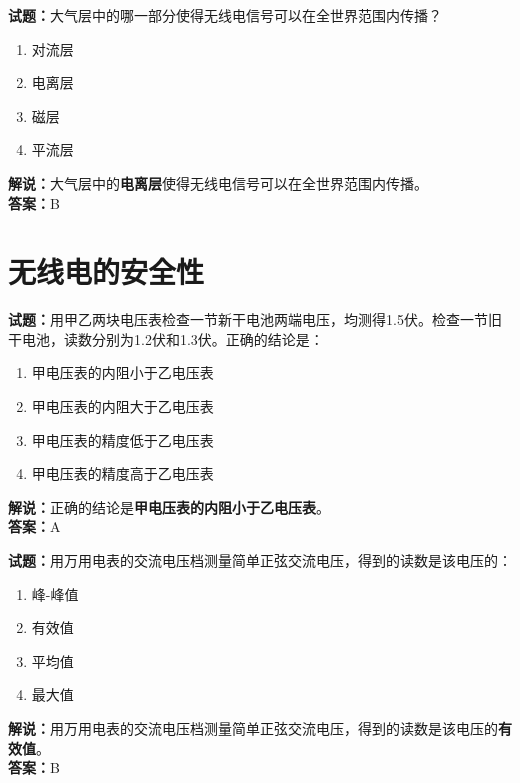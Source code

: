 \documentclass{ctexbook}
\begin{document}
\bigskip


\noindent\textbf{试题：}大气层中的哪一部分使得无线电信号可以在全世界范围内传播？
\begin{enumerate}[leftmargin=3em]
\item 对流层
\item 电离层
\item 磁层
\item 平流层
\end{enumerate}
\noindent\textbf{解说：}大气层中的\textbf{电离层}使得无线电信号可以在全世界范围内传播。\\\noindent\textbf{答案：}B






\chapter{无线电的安全性}

\newpage

\bigskip



\noindent\textbf{试题：}用甲乙两块电压表检查一节新干电池两端电压，均测得1.5伏。检查一节旧干电池，读数分别为1.2伏和1.3伏。正确的结论是：
\begin{enumerate}[leftmargin=3em]
	\item 甲电压表的内阻小于乙电压表
	\item 甲电压表的内阻大于乙电压表
	\item 甲电压表的精度低于乙电压表
	\item 甲电压表的精度高于乙电压表
\end{enumerate}
\noindent\textbf{解说：}正确的结论是\textbf{甲电压表的内阻小于乙电压表}。\\\noindent\textbf{答案：}A


\bigskip



\noindent\textbf{试题：}用万用电表的交流电压档测量简单正弦交流电压，得到的读数是该电压的：
\begin{enumerate}[leftmargin=3em]
	\item 峰-峰值
	\item 有效值
	\item 平均值
	\item 最大值
\end{enumerate}
\noindent\textbf{解说：}用万用电表的交流电压档测量简单正弦交流电压，得到的读数是该电压的\textbf{有效值}。\\\noindent\textbf{答案：}B
\end{document}
